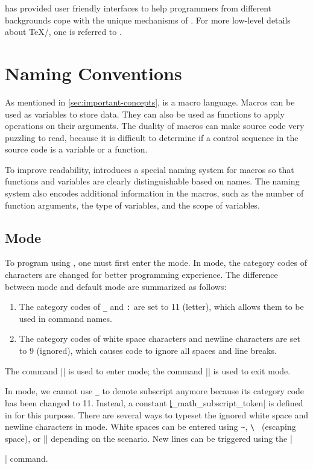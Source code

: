 \documentclass{ltugboat}
\begin{document}
\LTT{} has provided user friendly interfaces to help \LT{} programmers from different backgrounds cope with the unique mechanisms of \LT{}.
For more low-level details about \TeX{}/\LT{}, one is referred to \cite{knuth1984texbook,berry2017latex}.



\section{\LTT{} Naming Conventions}

As mentioned in \cref{sec:important-concepts}, \LT{} is a macro language.
Macros can be used as variables to store data.
They can also be used as functions to apply operations on their arguments.
The duality of macros can make \LT{} source code very puzzling to read, because it is difficult to determine if a control sequence in the source code is a variable or a function.

To improve readability, \LT{} introduces a special naming system for macros so that functions and variables are clearly distinguishable based on names. 
The naming system also encodes additional information in the macros, such as the number of function arguments, the type of variables, and the scope of variables. 


\subsection{\LTT{} Mode}


To program using \LTT{}, one must first enter the \LTT{} mode.
In \LTT{} mode, the category codes of characters are changed for better programming experience.
The difference between \LTT{} mode and default \LT{} mode are summarized as follows:
\begin{enumerate}
    \item The category codes of \verb|_| and \verb|:| are set to 11 (letter), which allows them to be used in command names.
    \item The category codes of white space characters and newline characters are set to 9 (ignored), which causes \LTT{} code to ignore all spaces and line breaks.
\end{enumerate}
The command \inltex|\ExplSyntaxOn| is used to enter \LTT{} mode; the command \inltex|\ExplSyntaxOff| is used to exit \LTT{} mode.

In \LTT{} mode, we cannot use \verb|_| to denote subscript anymore because its category code has been changed to 11. Instead, a constant \inltex|\c_math_subscript_token| is defined in \LTT{} for this purpose.
There are several ways to typeset the ignored white space and newline characters in \LTT{} mode.
White spaces can be entered using \verb|~|, \verb|\ | (escaping space), or \inltex|\space| depending on the scenario.
New lines can be triggered using the \inltex|\par| command.
\end{document}
